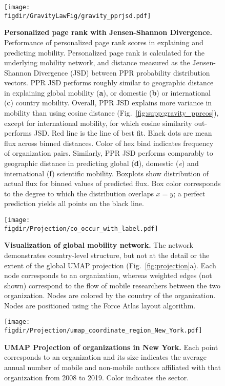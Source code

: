\documentclass[12pt]{article} %
\def\figdir{../Figs}
\begin{document}
%
%

\begin{figure}[p!]
	\centering
	\texttt{[image: \\figdir/GravityLawFig/gravity\_pprjsd.pdf]}
	\caption{
		\textbf{Personalized page rank with Jensen-Shannon Divergence.}
		Performance of personalized page rank scores in explaining and predicting mobility.
		Personalized page rank is calculated for the underlying mobility network, and distance measured as the Jensen-Shannon Divergence (JSD) between PPR probability distribution vectors.
		PPR JSD performs roughly similar to geographic distance in explaining global mobility (\textbf{a}), or domestic (\textbf{b}) or international (\textbf{c}) country mobility.
		Overall, PPR JSD explains more variance in mobility than using cosine distance (Fig.~\ref{fig:supp:gravity_pprcos}), except for international mobility, for which cosine similarity out-performs JSD.
		Red line is the line of best fit.
		Black dots are mean flux across binned distances.
		Color of hex bind indicates frequency of organization pairs.
		Similarly, PPR JSD performs comparably to geographic distance in predicting global (\textbf{d}), domestic (\textit{e}) and international (\textbf{f}) scientific mobility.
		Boxplots show distribution of actual flux for binned values of predicted flux.
		Box color corresponds to the degree to which the distribution overlaps $x = y$;
		a perfect prediction yields all points on the black line. 
	}
	\label{fig:supp:gravity_pprjsd}
\end{figure}


%
%
\begin{figure}[hp!]
	\centering
	\texttt{[image: \\figdir/Projection/co\_occur\_with\_label.pdf]}
	\caption{
		\textbf{Visualization of global mobility network.}
		The network demonstrates country-level structure, but not at the detail or the extent of the global UMAP projection (Fig.~\ref{fig:projection}a).
		Each node corresponds to an organization, whereas  weighted edges (not shown) correspond to the flow of mobile researchers between the two organization.
		Nodes are colored by the country of the organization.
		Nodes are positioned using the Force Atlas layout algorithm.
	}
	\label{fig:supp:network_vis}
\end{figure}



%
%
\begin{figure}[hp!]
	\centering
	\texttt{[image: \\figdir/Projection/umap\_coordinate\_region\_New\_York.pdf]}
	\caption{
		\textbf{UMAP Projection of organizations in New York.}
		Each point corresponds to an organization and its size indicates the average annual number of mobile and non-mobile authors affiliated with that organization from 2008 to 2019.
		Color indicates the sector.
	}
	\label{fig:supp:proj_newyork}
\end{figure}
\end{document}
